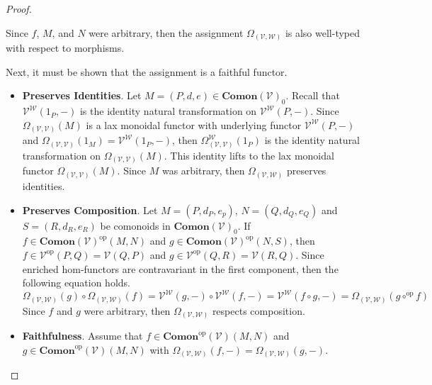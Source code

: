 \begin{proof}
\begin{itemize}
          Since $f$, $M$, and $N$ were arbitrary, then the assignment $\Omega_{(\mathcal{V},\mathcal{W})}$ is also well-typed with respect to morphisms.
    \end{itemize}
    Next, it must be shown that the assignment is a faithful functor.
    \begin{itemize}
    \item \textbf{Preserves Identities}.
          Let $M = ( P, d, e ) \in \mathbf{Comon}( \mathcal{V} )_0$.
          Recall that $\mathcal{V}^{\mathcal{W}}( 1_P, - )$ is the identity natural transformation on $\mathcal{V}^{\mathcal{W}}( P, - )$.
          Since $\Omega_{(\mathcal{V},\mathcal{V})}( M )$ is a lax monoidal functor with underlying functor $\mathcal{V}^{\mathcal{W}}( P, - )$ and $\Omega_{(\mathcal{V},\mathcal{V})}( 1_M ) = \mathcal{V}^{\mathcal{W}}( 1_P, - )$, then $\Omega_{(\mathcal{V},\mathcal{V})}^{\mathcal{W}}( 1_P )$ is the identity natural transformation on $\Omega_{(\mathcal{V},\mathcal{V})}( M )$.
          This identity lifts to the lax monoidal functor $\Omega_{(\mathcal{V},\mathcal{V})}( M )$.
          Since $M$ was arbitrary, then $\Omega_{(\mathcal{V},\mathcal{W})}$ preserves identities.
    \item \textbf{Preserves Composition}.
          Let $M = ( P, d_P, e_p )$, $N = ( Q, d_Q, e_Q )$ and $S = ( R, d_R, e_R )$ be comonoids in $\mathbf{Comon}( \mathcal{V} )_0$.
          If $f \in \mathbf{Comon}( \mathcal{V} )^{\text{op}}( M, N )$ and $g \in \mathbf{Comon}( \mathcal{V} )^{\text{op}}( N, S )$, then $f \in \mathcal{V}^{\text{op}}( P, Q ) = \mathcal{V}( Q, P )$ and $g \in \mathcal{V}^{\text{op}}( Q, R ) = \mathcal{V}( R, Q )$.
          Since enriched hom-functors are contravariant in the first component, then the following equation holds.
          \begin{equation*}
              \Omega_{(\mathcal{V},\mathcal{W})}( g ) \circ \Omega_{(\mathcal{V},\mathcal{W})}( f )
              =
              \mathcal{V}^{\mathcal{W}}( g, - ) \circ \mathcal{V}^{\mathcal{W}}( f, - )
              =
              \mathcal{V}^{\mathcal{W}}( f \circ g, - )
              =
              \Omega_{(\mathcal{V},\mathcal{W})}( g \circ^{\text{op}} f )
          \end{equation*}
          Since $f$ and $g$ were arbitrary, then $\Omega_{(\mathcal{V},\mathcal{W})}$ respects composition.
    \item \textbf{Faithfulness}.
           Assume that $f \in \mathbf{Comon}^{\text{op}}( \mathcal{V} )( M, N )$ and $g \in \mathbf{Comon}^{\text{op}}( \mathcal{V} )( M, N )$ with $\Omega_{(\mathcal{V},\mathcal{W})}( f, - ) = \Omega_{(\mathcal{V},\mathcal{W})}( g, - )$.

\end{itemize}
\end{proof}
